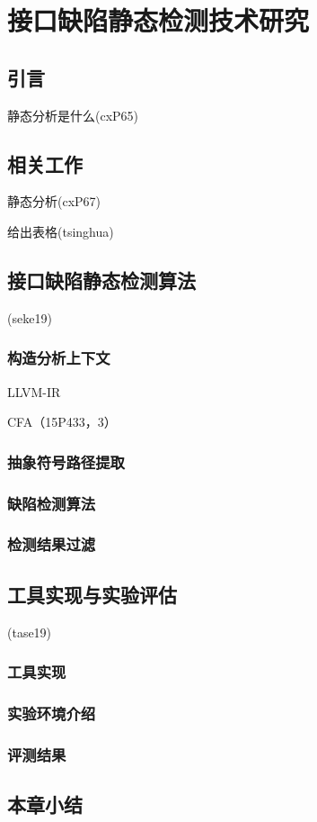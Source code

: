 \chapter{接口缺陷静态检测技术研究}
\label{cha:imchecker}

\section{引言}
静态分析是什么(cxP65)
\section{相关工作}
静态分析(cxP67)


给出表格(tsinghua)






\section{接口缺陷静态检测算法}
(seke19)
\subsection{构造分析上下文}
LLVM-IR

CFA（15P433，3）

\subsection{抽象符号路径提取}
\subsection{缺陷检测算法}
\subsection{检测结果过滤}

\section{工具实现与实验评估}
(tase19)
\subsection{工具实现}
\subsection{实验环境介绍}
\subsection{评测结果}

\section{本章小结}
